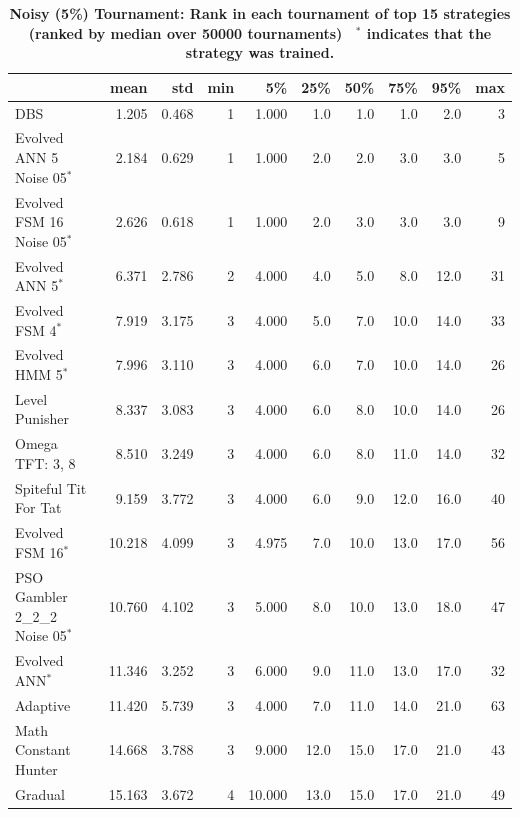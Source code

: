\documentclass[10pt,letterpaper]{article}
\begin{document}
\begin{table}[!hbtp]
    \centering
        \caption{\bf Noisy (5\%) Tournament: Rank in each tournament
        of top 15 strategies (ranked by median over
        50000 tournaments)
        ~$^{*}$ indicates that the strategy was trained.}
        \footnotesize
\begin{tabular}{lrrrrrrrrr}
\toprule
{} &    mean &    std &  min &      5\% &   25\% &   50\% &   75\% &   95\% &  max \\
\midrule
DBS                              &   1.205 &  0.468 &    1 &   1.000 &   1.0 &   1.0 &   1.0 &   2.0 &    3 \\
Evolved ANN 5 Noise 05$^{*}$     &   2.184 &  0.629 &    1 &   1.000 &   2.0 &   2.0 &   3.0 &   3.0 &    5 \\
Evolved FSM 16 Noise 05$^{*}$    &   2.626 &  0.618 &    1 &   1.000 &   2.0 &   3.0 &   3.0 &   3.0 &    9 \\
Evolved ANN 5$^{*}$              &   6.371 &  2.786 &    2 &   4.000 &   4.0 &   5.0 &   8.0 &  12.0 &   31 \\
Evolved FSM 4$^{*}$              &   7.919 &  3.175 &    3 &   4.000 &   5.0 &   7.0 &  10.0 &  14.0 &   33 \\
Evolved HMM 5$^{*}$              &   7.996 &  3.110 &    3 &   4.000 &   6.0 &   7.0 &  10.0 &  14.0 &   26 \\
Level Punisher                   &   8.337 &  3.083 &    3 &   4.000 &   6.0 &   8.0 &  10.0 &  14.0 &   26 \\
Omega TFT: 3, 8                  &   8.510 &  3.249 &    3 &   4.000 &   6.0 &   8.0 &  11.0 &  14.0 &   32 \\
Spiteful Tit For Tat             &   9.159 &  3.772 &    3 &   4.000 &   6.0 &   9.0 &  12.0 &  16.0 &   40 \\
Evolved FSM 16$^{*}$             &  10.218 &  4.099 &    3 &   4.975 &   7.0 &  10.0 &  13.0 &  17.0 &   56 \\
PSO Gambler 2\_2\_2 Noise 05$^{*}$ &  10.760 &  4.102 &    3 &   5.000 &   8.0 &  10.0 &  13.0 &  18.0 &   47 \\
Evolved ANN$^{*}$                &  11.346 &  3.252 &    3 &   6.000 &   9.0 &  11.0 &  13.0 &  17.0 &   32 \\
Adaptive                         &  11.420 &  5.739 &    3 &   4.000 &   7.0 &  11.0 &  14.0 &  21.0 &   63 \\
Math Constant Hunter             &  14.668 &  3.788 &    3 &   9.000 &  12.0 &  15.0 &  17.0 &  21.0 &   43 \\
Gradual                          &  15.163 &  3.672 &    4 &  10.000 &  13.0 &  15.0 &  17.0 &  21.0 &   49 \\
\bottomrule
\end{tabular}
        \label{tbl:noisy_ranks}
\end{table}
\end{document}
